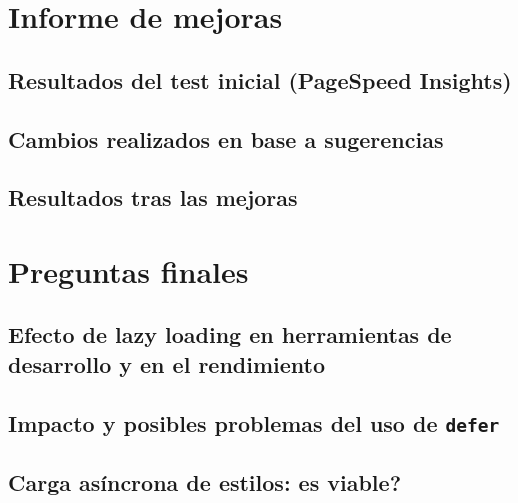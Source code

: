 \documentclass{article}
\begin{document}
\section{Informe de mejoras}\label{sec:informe-de-mejoras}

\subsection{Resultados del test inicial (PageSpeed Insights)}\label{subsec:resultados-del-test-inicial}

\subsection{Cambios realizados en base a sugerencias}\label{subsec:cambios-realizados}

\subsection{Resultados tras las mejoras}\label{subsec:resultados-tras-las-mejoras}

\section{Preguntas finales}\label{sec:preguntas-finales}

\subsection{Efecto de lazy loading en herramientas de desarrollo y en el rendimiento}\label{subsec:efecto-de-lazy-loading}

\subsection{Impacto y posibles problemas del uso de \texttt{defer}}\label{subsec:impacto-y-problemas-de-defer}

\subsection{Carga asíncrona de estilos:  \textquestiondown es viable?}\label{subsec:carga-asincrona-de-estilos}
\end{document}
